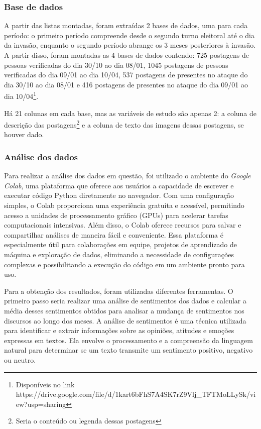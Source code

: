 \documentclass[manuscript,screen,review]{acmart}
\begin{document}
\subsubsection{Base de dados}

A partir das listas montadas, foram extraídas 2 bases de dados, uma para cada período: o primeiro período compreende desde o segundo turno eleitoral até o dia da invasão, enquanto o segundo período abrange os 3 meses posteriores à invasão. A partir disso, foram montadas as 4 bases de dados contendo: 725 postagens de pessoas verificadas do dia 30/10 ao dia 08/01, 1045 postagens de pessoas verificadas do dia 09/01 ao dia 10/04, 537 postagens de presentes no ataque do dia 30/10 ao dia 08/01 e 416 postagens de presentes no ataque do dia 09/01 ao dia 10/04\footnote{Disponíveis no link https://drive.google.com/file/d/1kart6bFhS7A4SK7rZ9Vlj\_TFTMoLLySk/view?usp=sharing}.

Há 21 colunas em cada base, mas as variáveis de estudo são apenas 2: a coluna de descrição das postagens\footnote{Seria o conteúdo ou legenda dessas postagens} e a coluna de texto das imagens dessas postagens, se houver dado.

\subsubsection{Análise dos dados}

Para realizar a análise dos dados em questão, foi utilizado o ambiente do \textit{Google Colab}, uma plataforma que oferece aos usuários a capacidade de escrever e executar código Python diretamente no navegador. Com uma configuração simples, o Colab proporciona uma experiência gratuita e acessível, permitindo acesso a unidades de processamento gráfico (GPUs) para acelerar tarefas computacionais intensivas. Além disso, o Colab oferece recursos para salvar e compartilhar análises de maneira fácil e conveniente. Essa plataforma é especialmente útil para colaborações em equipe, projetos de aprendizado de máquina e exploração de dados, eliminando a necessidade de configurações complexas e possibilitando a execução do código em um ambiente pronto para uso.

Para a obtenção dos resultados, foram utilizadas diferentes ferramentas. O primeiro passo seria realizar uma análise de sentimentos dos dados e calcular a média desses sentimentos obtidos para analisar a mudança de sentimentos nos discursos ao longo dos meses. A análise de sentimentos é uma técnica utilizada para identificar e extrair informações sobre as opiniões, atitudes e emoções expressas em textos. Ela envolve o processamento e a compreensão da linguagem natural para determinar se um texto transmite um sentimento positivo, negativo ou neutro.
\end{document}
